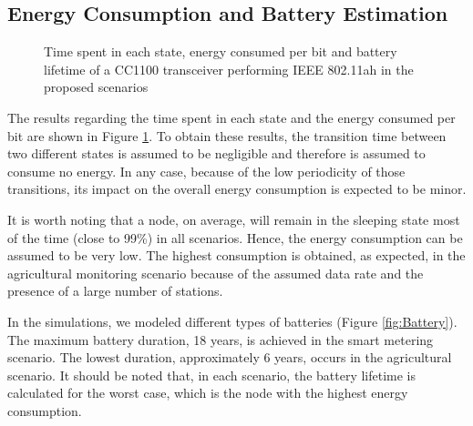 \documentclass[]{article}
\begin{document}
\subsection{Energy Consumption and Battery Estimation}
\renewcommand\thefigure{3} 
\begin{figure}[p]
\begin{center}
\caption{Time spent in each state, energy consumed per bit and battery lifetime of a CC1100 transceiver performing IEEE 802.11ah in the proposed scenarios} \label{fig:energy}
\end{center}
\end{figure}

The results regarding the time spent in each state and the energy consumed per bit are shown in Figure \ref{fig:energy}. To obtain these results, the transition time between two different states is assumed to be negligible and therefore is assumed to consume no energy. In any case, because of the low periodicity of those transitions, its impact on the overall energy consumption is expected to be minor.

It is worth noting that a node, on average, will remain in the sleeping state most of the time (close to 99\%) in all scenarios. Hence, the energy consumption can be assumed to be very low. The highest consumption is obtained, as expected, in the agricultural monitoring scenario because of the assumed data rate and the presence of a large number of stations.

In the simulations, we modeled different types of batteries (Figure \ref{fig:Battery}). The maximum battery duration, 18 years, is achieved in the smart metering scenario. The lowest duration, approximately 6 years, occurs in the agricultural scenario. It should be noted that, in each scenario, the battery lifetime is calculated for the worst case, which is the node with the highest energy consumption.
\end{document}
